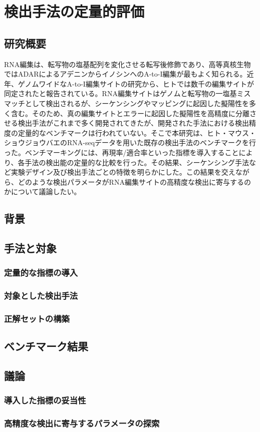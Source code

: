 \chapter{検出手法の定量的評価}

\section{研究概要}
RNA編集は、転写物の塩基配列を変化させる転写後修飾であり、高等真核生物ではADARによるアデニンからイノシンへのA-to-I編集が最もよく知られる。近年、ゲノムワイドなA-to-I編集サイトの研究から、ヒトでは数千の編集サイトが同定されたと報告されている。RNA編集サイトはゲノムと転写物の一塩基ミスマッチとして検出されるが、シーケンシングやマッピングに起因した擬陽性を多く含む。そのため、真の編集サイトとエラーに起因した擬陽性を高精度に分離させる検出手法がこれまで多く開発されてきたが、開発された手法における検出精度の定量的なベンチマークは行われていない。そこで本研究は、ヒト・マウス・ショウジョウバエのRNA-seqデータを用いた既存の検出手法のベンチマークを行った。ベンチマーキングには、再現率/適合率といった指標を導入することにより、各手法の検出能の定量的な比較を行った。その結果、シーケンシング手法など実験デザイン及び検出手法ごとの特徴を明らかにした。この結果を交えながら、どのような検出パラメータがRNA編集サイトの高精度な検出に寄与するのかについて議論したい。

\section{背景}

\section{手法と対象}
\subsection{定量的な指標の導入}
\subsection{対象とした検出手法}
\subsection{正解セットの構築}

\section{ベンチマーク結果}

\section{議論}
\subsection{導入した指標の妥当性}
\subsection{高精度な検出に寄与するパラメータの探索}

